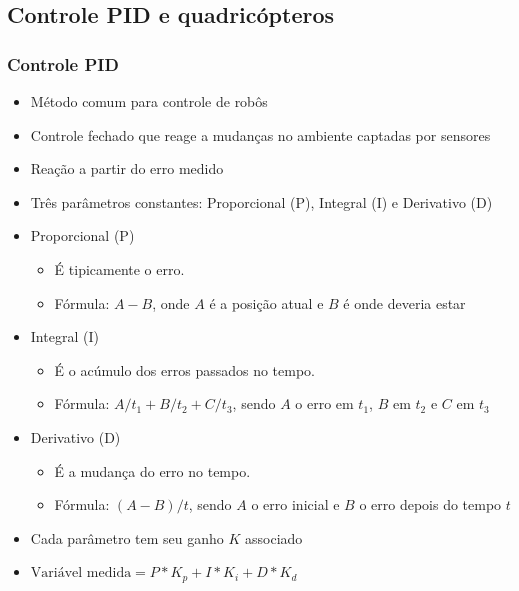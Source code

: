\documentclass{beamer}
\begin{document}
\subsection*{Controle PID e quadricópteros}
\begin{frame}[allowframebreaks]
	
	\frametitle{Controle PID}
	\begin{itemize}
	
		\item Método comum para controle de robôs
		
		\item Controle fechado que reage a mudanças no ambiente captadas por sensores
		
		\item Reação a partir do erro medido
		
		\item Três parâmetros constantes: Proporcional (P), Integral (I) e Derivativo (D)
		
	\framebreak
	
		\item Proporcional (P)
			\begin{itemize}
				\item É tipicamente o erro. 
				\item Fórmula: $A - B$, onde $A$ é a posição atual e $B$ é onde deveria estar 	
			\end{itemize}
			
		\item Integral (I)
		\begin{itemize}
			\item É o acúmulo dos erros passados no tempo. 
			\item Fórmula: $A/t_1 + B/t_2 + C/t_3$, sendo $A$ o erro em $t_1$, $B$ em $t_2$ e $C$ em $t_3$ 	
		\end{itemize}	
		
		\item Derivativo (D)
		\begin{itemize}
			\item É a mudança do erro no tempo. 
			\item Fórmula: $(A-B)/t$, sendo $A$ o erro inicial e $B$ o erro depois do tempo $t$ 	
		\end{itemize}	
		
	\framebreak
	
		\item Cada parâmetro tem seu ganho $K$ associado
		
		\item $ \mbox{Variável medida} = P*K_p + I*K_i + D*K_d$
		

\end{itemize}
\end{frame}
\end{document}
